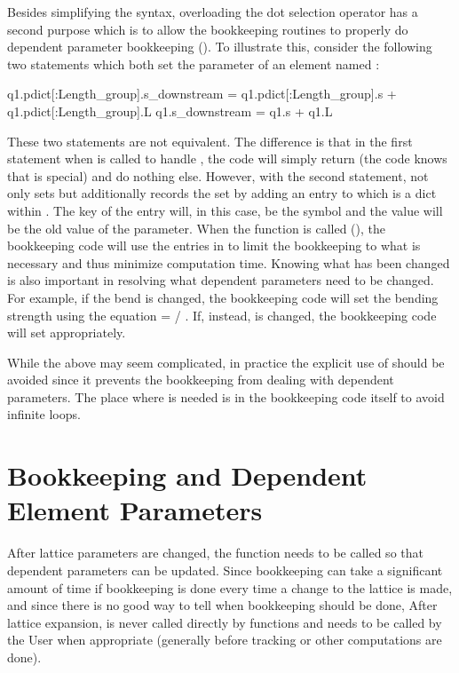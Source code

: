 Besides simplifying the syntax, overloading the dot selection operator has a second purpose which
is to allow the \accellat bookkeeping routines to properly do dependent parameter bookkeeping ().
To illustrate this, consider the following two statements which both set the 
parameter of an element named :
\begin{example}
  q1.pdict[:Length_group].s_downstream = q1.pdict[:Length_group].s + 
                                                     q1.pdict[:Length_group].L
  q1.s_downstream = q1.s + q1.L
\end{example}
These two statements are not equivalent. The difference is that in the first statement when
 is called to handle , the code will simply return  
(the code knows that  is special) and do nothing else. 
However, with the second statement,  not only sets
 but additionally records the set by adding an entry to
 which is a dict within . 
The key of the entry will, in this case, be the symbol  
and the value will be the old value of the parameter. 
When the  function is called (), the bookkeeping code will use the
entries in  to limit the bookkeeping to what is necessary and thus
minimize computation time. 
Knowing what has been changed is also important in resolving what
dependent parameters need to be changed. 
For example, if the bend  is changed, the bookkeeping code will set the 
bending strength  using the equation  =  / . If, instead,
 is changed, the bookkeeping code will set  appropriately. 

While the above may seem complicated, in practice the explicit use of  should be avoided
since it prevents the bookkeeping from dealing with dependent parameters.
The place where  is needed is in the bookkeeping code itself to avoid infinite loops.
 

\section{Bookkeeping and Dependent Element Parameters}
\label{s:param.depend}

After lattice parameters are changed, the function  needs to be called
so that dependent parameters can be updated. 
Since bookkeeping can take a significant amount of time if bookkeeping is done every time
a change to the lattice is made, and since there is no good way to tell when bookkeeping should
be done, After lattice expansion,  is never called directly by \accellat 
functions and needs to be called by the User when appropriate (generally before tracking or
other computations are done).

